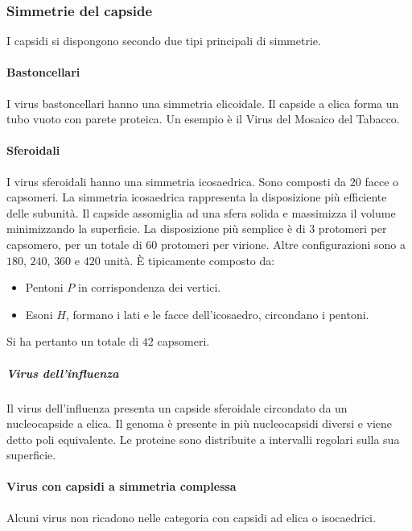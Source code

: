		
		\subsubsection{Simmetrie del capside}
		I capsidi si dispongono secondo due tipi principali di simmetrie.

			\paragraph{Bastoncellari}
			I virus bastoncellari hanno una simmetria elicoidale.
			Il capside a elica forma un tubo vuoto con parete proteica.
			Un esempio \`e il Virus del Mosaico del Tabacco.

			\paragraph{Sferoidali}
			I virus sferoidali hanno una simmetria icosaedrica.
			Sono composti da $20$ facce o capsomeri.
			La simmetria icosaedrica rappresenta la disposizione pi\`u efficiente delle subunit\`a.
			Il capside assomiglia ad una sfera solida e massimizza il volume minimizzando la superficie.
			La disposizione pi\`u semplice \`e di $3$ protomeri per capsomero, per un totale di $60$ protomeri per virione.
			Altre configurazioni sono a $180$, $240$, $360$ e $420$ unit\`a.
			\`E tipicamente composto da:
			\begin{multicols}{2}
				\begin{itemize}
					\item Pentoni $P$ in corrispondenza dei vertici.
					\item Esoni $H$, formano i lati e le facce dell'icosaedro, circondano i pentoni.
				\end{itemize}
			\end{multicols}
			Si ha pertanto un totale di $42$ capsomeri.

				\subparagraph{Virus dell'influenza}
				Il virus dell'influenza presenta un capside sferoidale circondato da un nucleocapside a elica.
				Il genoma \`e presente in pi\`u nucleocapsidi diversi e viene detto poli equivalente.
				Le proteine sono distribuite a intervalli regolari sulla sua superficie.
			
			\paragraph{Virus con capsidi a simmetria complessa}
			Alcuni virus non ricadono nelle categoria con capsidi ad elica o isocaedrici. 
	
